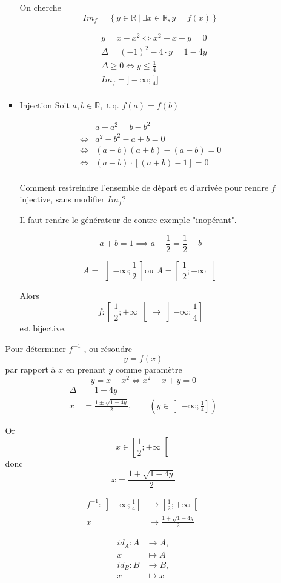 \documentclass[
    11pt,
    a4paper,
    oneside,
    headinlcude, footinclude,
    twoside,
]{report}
\newcommand{\tq}[0]{\textrm{ t.q. }}
\begin{document}
\begin{enumerate}
\begin{enumerate}
\begin{itemize}
On cherche $$Im_{f} = \left\{y \in \mathbb{R}\ |\
\exists x \in \mathbb{R}, y = f(x)\right\}$$

\[
\begin{split}
&y = x - x^{2} \iff x^{2} - x + y = 0 \\
&\Delta = (-1)^{2} - 4 \cdot y = 1 - 4y \\
&\Delta \geq 0 \iff y \leq \frac{1}{4} \\
& Im_{f} = ] -\infty; \frac{1}{4}]\\
\end{split}
\]

\item Injection
Soit $a, b \in \mathbb{R}, \tq f(a) = f(b)$ 

\[
\begin{split}
&a - a^{2}= b - b^{2}\\
\iff & a^{2} - b ^{2} - a + b = 0\\
\iff & (a - b) (a+b) - (a-b) = 0\\
\iff & (a - b) \cdot [(a+b) - 1] = 0\\
\end{split}
\]

Comment restreindre l'ensemble de départ et
d'arrivée pour rendre $f$ injective, sans modifier
$Im_{f}$?

Il faut rendre le générateur de contre-exemple
"inopérant".

$$a + b = 1 \implies a - \frac{1}{2} = \frac{1}{2}
- b$$

$$A =\ \left]- \infty; \frac{1}{2}\ \right] \text{
ou } A  = \left[\ \frac{1}{2}; + \infty\ \right[$$

Alors 
$$ f: \left[\ \frac{1}{2}; + \infty\ \right[ \to
\left] - \infty; \frac{1}{4} \right] $$
est bijective.
\end{itemize}

Pour déterminer $f^{-1}$ , ou résoudre 
$$y = f(x)$$
par rapport à $x$ en prenant $y$ comme paramètre
$$y = x - x^{2} \iff x^{2} - x + y = 0$$
\[
\begin{split}
\Delta &= 1 - 4y\\
x &= \frac{1 \pm \sqrt{1 - 4y}}{2}, \quad \quad \left(y \in
\left] - \infty; \frac{1}{4} \right]\right)
\end{split}
\]

Or
$$x \in \left[ \frac{1}{2}; + \infty \right[$$
donc
$$ x = \frac{1 + \sqrt{1 - 4y}}{2}$$

\[
\begin{split}
f^{-1}: \left] - \infty; \frac{1}{4} \right] &\to
\left[ \frac{1}{2}; + \infty \right[\\
x &\mapsto \frac{1+ \sqrt{1 - 4y}}{2}
\end{split}
\]

\[
\begin{split}
id_{A}: A &\to A,\\
x &\mapsto A\\
id_{B}: B &\to B,\\
x &\mapsto x\\
\end{split}
\]
\end{enumerate}
\end{enumerate}
\end{document}

